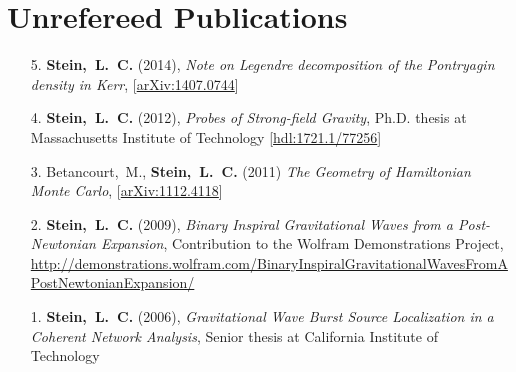 \section{\sc Unrefereed Publications}
\begin{enumerate}
\item[{5.}] {\bf Stein,~L.~C.} (2014), {\it Note on Legendre decomposition of the Pontryagin density in Kerr},
  [\href{http://arxiv.org/abs/1407.0744}{arXiv:1407.0744}]
\item[{4.}] {\bf Stein,~L.~C.} (2012), {\it Probes of Strong-field Gravity}, Ph.D. thesis at Massachusetts Institute of Technology
  [\href{http://hdl.handle.net/1721.1/77256}{hdl:1721.1/77256}]
\item[{3.}] Betancourt,~M., {\bf Stein,~L.~C.} (2011) {\it The
    Geometry of Hamiltonian Monte Carlo},
  [\href{http://arxiv.org/abs/1112.4118}{arXiv:1112.4118}]
\item[{2.}] {\bf Stein,~L.~C.} (2009), {\it Binary Inspiral
    Gravitational Waves from a Post-Newtonian Expansion}, Contribution
  to the Wolfram Demonstrations Project, \url{http://demonstrations.wolfram.com/BinaryInspiralGravitationalWavesFromAPostNewtonianExpansion/}
\item[{1.}] {\bf Stein,~L.~C.} (2006), {\it Gravitational Wave Burst Source Localization in a Coherent Network Analysis}, Senior thesis at California Institute of Technology
\end{enumerate}


